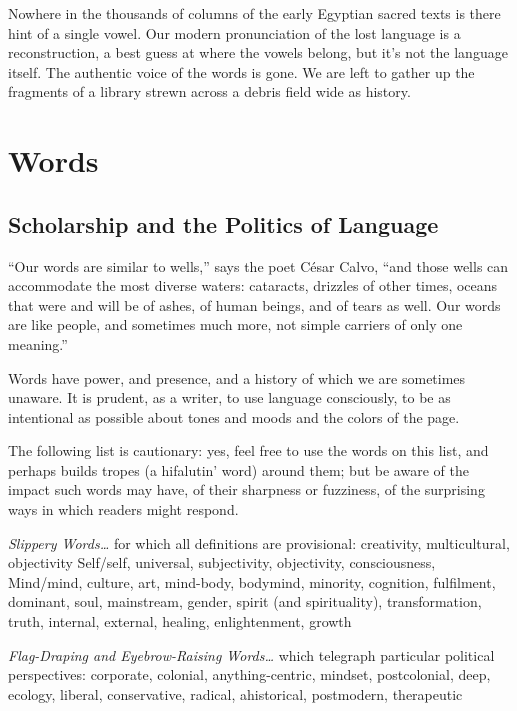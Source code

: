 \documentclass[letterpaper,oneside]{memoir}
\begin{document}
\begin{description}
Nowhere in the thousands of columns of the early Egyptian sacred texts is there hint of a single vowel. Our modern pronunciation of the lost language is a reconstruction, a best guess at where the vowels belong, but it's not the language itself. The authentic voice of the words is gone. We are left to gather up the fragments of a library strewn across a debris field wide as history.
\newpage
\section{Words}
\subsection{Scholarship and the Politics of Language}

``Our words are similar to wells,'' says the poet C\'esar Calvo, ``and those wells can accommodate the most diverse waters: cataracts, drizzles of other times, oceans that were and will be of ashes, of human beings, and of tears as well. Our words are like people, and sometimes much more, not simple carriers of only one meaning.''

Words have power, and presence, and a history of which we are sometimes unaware. It is prudent, as a writer, to use language consciously, to be as intentional as possible about tones and moods and the colors of the page.

The following list is cautionary: yes, feel free to use the words on this list, and perhaps builds tropes (a hifalutin' word) around them; but be aware of the impact such words may have, of their sharpness or fuzziness, of the surprising ways in which readers might respond.

\begin{description}

\item \textit{{Slippery Words\ldots}} for which all definitions are provisional: creativity, multicultural, objectivity Self/self, universal, subjectivity, objectivity, consciousness, Mind/mind, culture, art, mind-body, bodymind, minority, cognition, fulfilment, dominant, soul, mainstream, gender, spirit (and spirituality), transformation, truth, internal, external, healing, enlightenment, growth

\item \textit{{Flag-Draping and Eyebrow-Raising Words\ldots}} which telegraph particular political perspectives: corporate, colonial, anything-centric, mindset, postcolonial, deep, ecology, liberal, conservative, radical, ahistorical, postmodern, therapeutic


\end{description}
\end{description}
\end{document}
